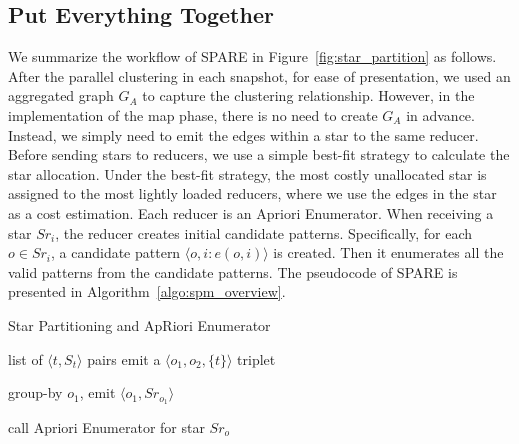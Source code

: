 \subsection{Put Everything Together}
We summarize the workflow of SPARE in Figure~\ref{fig:star_partition} as follows. After the parallel clustering in each snapshot, for ease of presentation, we used an aggregated graph $G_A$ to capture the clustering relationship. However, in the implementation of the map phase, there is no need to create $G_A$ in advance. Instead, we simply need to emit the edges within a star to the same reducer. Before sending stars to reducers, we use a simple best-fit strategy to calculate the star allocation. Under the best-fit strategy, the most costly unallocated star is assigned to the most lightly loaded reducers, where we use the edges in the star as a cost estimation.
 Each reducer is an Apriori Enumerator. When receiving a star $Sr_i$, the reducer creates initial candidate patterns. Specifically, for each $o \in Sr_i$, a candidate pattern $\langle o,i: e(o,i) \rangle$ is created. Then it enumerates all the valid patterns from the candidate patterns. The pseudocode of SPARE is presented in Algorithm~\ref{algo:spm_overview}. 

\begin{algorithm}
\small
\caption{Star Partitioning and ApRiori Enumerator}
\label{algo:spm_overview}
\begin{algorithmic}[1]
\Require list of $\langle t, S_t \rangle$ pairs
\label{code:spm-map-start}
	\State emit a $\langle o_1, o_2, \{t\}\rangle$ triplet~\label{code:spm-edge-direct}
	\EndFor
\EndFor
\label{code:spm-map-end}

\label{code:spm-shuffle-start}
	\State group-by $o_1$, emit $\langle o_1, Sr_{o_1} \rangle$ 
\EndFor
\label{code:spm-shuffle-end}

\label{code:spm-reduce-start}
\State call Apriori Enumerator for star $Sr_o$
\EndFor
\label{code:spm-reduce-end}

\end{algorithmic}
\end{algorithm}

